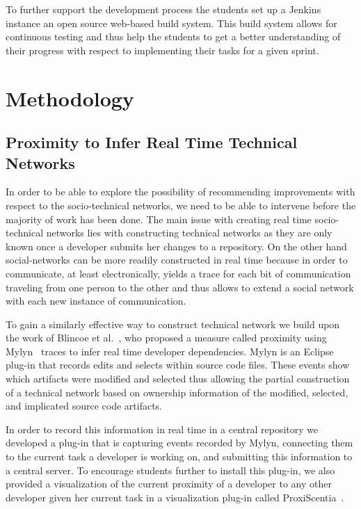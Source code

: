 To further support the development process the students set up a Jenkins instance an open source web-based build system.
This build system allows for continuous testing and thus help the students to get a better understanding of their progress with respect to implementing their tasks for a given sprint.

\section{Methodology}
\label{ch10:meth}
\subsection{Proximity to Infer Real Time Technical Networks}
\label{chap:making:subset:proximity}
In order to be able to explore the possibility of recommending improvements with respect to the socio-technical networks, we need to be able to intervene before the majority of work has been done.
The main issue with creating real time socio-technical networks lies with constructing technical networks as they are only known once a developer submits her changes to a repository.
On the other hand social-networks can be more readily constructed in real time because in order to communicate, at least electronically, yields a trace for each bit of communication traveling from one person to the other and thus allows to extend a social network with each new instance of communication.

To gain a similarly effective way to construct technical network we build upon the work of Blincoe et al.~\cite{blincoe:cscw:2012}, who proposed a measure called proximity using Mylyn~\cite{kersten:aosd:2005} traces to infer real time developer dependencies.
Mylyn is an Eclipse plug-in that records edits and selects within source code files.
These events show which artifacts were modified and selected thus allowing the partial construction of a technical network based on ownership information of the modified, selected, and implicated source code artifacts.

In order to record this information in real time in a central repository we developed a plug-in that is capturing events recorded by Mylyn, connecting them to the current task a developer is working on, and submitting this information to a central server. 
To encourage students further to install this plug-in, we also provided a visualization of the current proximity of a developer to any other developer given her current task in a visualization plug-in called ProxiScentia~\cite{borici:chase:2012}.

